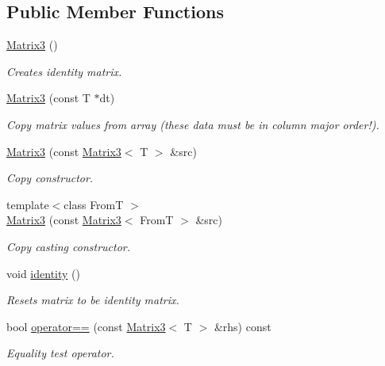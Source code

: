 \subsection*{Public Member Functions}
\begin{DoxyCompactItemize}
\item 
\hyperlink{class_matrix3_afbc8b655540e4b5b04d8439b606303b0}{Matrix3} ()
\begin{DoxyCompactList}\small\item\em Creates identity matrix. \item\end{DoxyCompactList}\item 
\hyperlink{class_matrix3_a3986b8f36efefb3ab2455e86fdb5e327}{Matrix3} (const T $\ast$dt)
\begin{DoxyCompactList}\small\item\em Copy matrix values from array (these data must be in column major order!). \item\end{DoxyCompactList}\item 
\hyperlink{class_matrix3_a7f0b1ceaedeffd2ab458b6dc7edc358c}{Matrix3} (const \hyperlink{class_matrix3}{Matrix3}$<$ T $>$ \&src)
\begin{DoxyCompactList}\small\item\em Copy constructor. \item\end{DoxyCompactList}\item 
{\footnotesize template$<$class FromT $>$ }\\\hyperlink{class_matrix3_acf94796374f73b4559336f08e233038c}{Matrix3} (const \hyperlink{class_matrix3}{Matrix3}$<$ FromT $>$ \&src)
\begin{DoxyCompactList}\small\item\em Copy casting constructor. \item\end{DoxyCompactList}\item 
void \hyperlink{class_matrix3_a44360e8ae549ec4b2b9c0f8ed4786761}{identity} ()
\begin{DoxyCompactList}\small\item\em Resets matrix to be identity matrix. \item\end{DoxyCompactList}\item 
bool \hyperlink{class_matrix3_acf8dc6060016d09250b8706e89f4dcc0}{operator==} (const \hyperlink{class_matrix3}{Matrix3}$<$ T $>$ \&rhs) const 
\begin{DoxyCompactList}\small\item\em Equality test operator. \item\end{DoxyCompactList}\item 

\end{DoxyCompactItemize}
